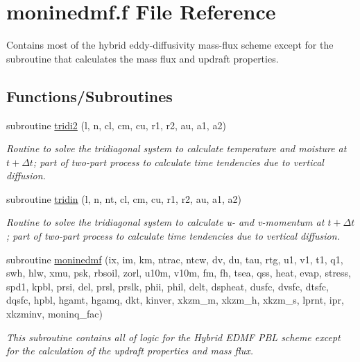 \hypertarget{moninedmf_8f}{}\section{moninedmf.\+f File Reference}
\label{moninedmf_8f}


Contains most of the hybrid eddy-\/diffusivity mass-\/flux scheme except for the subroutine that calculates the mass flux and updraft properties.  


\subsection*{Functions/\+Subroutines}
\begin{DoxyCompactItemize}
\item 
subroutine \hyperlink{group___h_e_d_m_f_ga80bebdc639adaba3ed0ed2ea2f24315e}{tridi2} (l, n, cl, cm, cu, r1, r2, au, a1, a2)
\begin{DoxyCompactList}\small\item\em Routine to solve the tridiagonal system to calculate temperature and moisture at $ t + \Delta t $; part of two-\/part process to calculate time tendencies due to vertical diffusion. \end{DoxyCompactList}\item 
subroutine \hyperlink{moninedmf_8f_ab77885fe7ace4ef00558157788778408}{tridin} (l, n, nt, cl, cm, cu, r1, r2, au, a1, a2)
\begin{DoxyCompactList}\small\item\em Routine to solve the tridiagonal system to calculate u-\/ and v-\/momentum at $ t + \Delta t $; part of two-\/part process to calculate time tendencies due to vertical diffusion. \end{DoxyCompactList}\end{DoxyCompactItemize}
\textbf{ }\par
\begin{DoxyCompactItemize}
\item 
subroutine \hyperlink{group___h_e_d_m_f_ga367b6dabfff601023af323f900db86d2}{moninedmf} (ix, im, km, ntrac, ntcw, dv, du, tau, rtg, u1, v1, t1, q1, swh, hlw, xmu, psk, rbsoil, zorl, u10m, v10m, fm, fh, tsea, qss, heat, evap, stress, spd1, kpbl, prsi, del, prsl, prslk, phii, phil, delt, dspheat, dusfc, dvsfc, dtsfc, dqsfc, hpbl, hgamt, hgamq, dkt, kinver, xkzm\+\_\+m, xkzm\+\_\+h, xkzm\+\_\+s, lprnt, ipr, xkzminv, moninq\+\_\+fac)
\begin{DoxyCompactList}\small\item\em This subroutine contains all of logic for the Hybrid E\+D\+MF P\+BL scheme except for the calculation of the updraft properties and mass flux. \end{DoxyCompactList}\end{DoxyCompactItemize}



